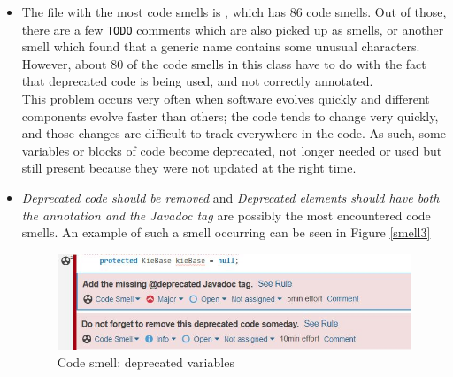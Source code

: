 \begin{itemize}
                \item The file with the most code smells is 
                , which has 86 code smells. Out of those, there are a few \texttt{TODO} comments which are also picked up as smells, or another smell which found that a generic name contains some unusual characters. However, about 80 of the code smells in this class have to do with the fact that deprecated code is being used, and not correctly annotated. \\
                This problem occurs very often when software evolves quickly and different components evolve faster than others; the code tends to change very quickly, and those changes are difficult to track everywhere in the code. As such, some variables or blocks of code become deprecated, not longer needed or used but still present because they were not updated at the right time. 
                \item \textit{Deprecated code should be removed} and \textit{Deprecated elements should have both the annotation and the Javadoc tag} are possibly the most encountered code smells. An example of such a smell occurring can be seen in Figure \ref{smell3}
                \begin{figure}[H]
                    \centering
                    \includegraphics[scale=1.35]{figures/codesmell3.JPG}
                    \caption{Code smell: deprecated variables}
                    \label{fig:smell3}
                \end{figure}
                

\end{itemize}
